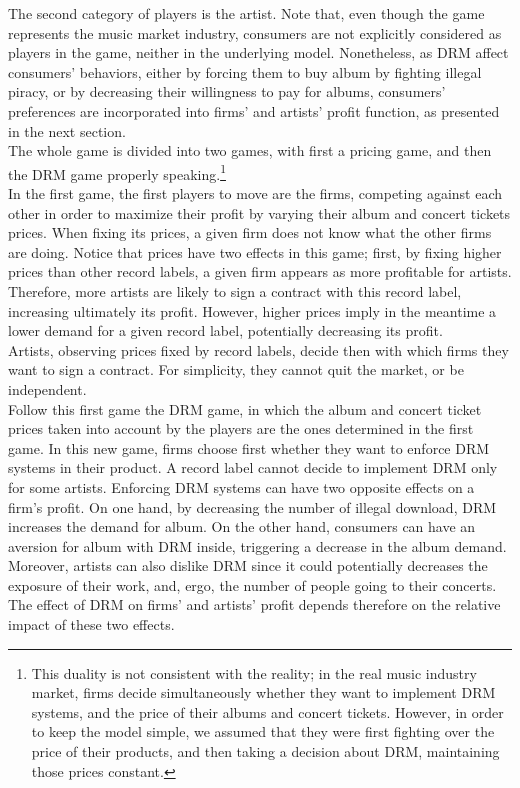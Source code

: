 \documentclass[a4paper,12pt]{article}
\numberwithin{equation}{section}
\begin{document}
The second category of players is the artist. Note that, even though the game represents the music market industry, consumers are not explicitly considered as players in the game, neither in the underlying model. Nonetheless, as DRM affect consumers' behaviors, either by forcing them to buy album by fighting illegal piracy, or by decreasing their willingness to pay for albums, consumers' preferences are incorporated into firms' and artists' profit function, as presented in the next section.\\

The whole game is divided into two games, with first a pricing game, and then the DRM game properly speaking.\footnote{
This duality is not consistent with the reality; in the real music industry market, firms decide simultaneously whether they want to implement DRM systems, and the price of their albums and concert tickets. However, in order to keep the model simple, we assumed that they were first fighting over the price of their products, and then taking a decision about DRM, maintaining those prices constant.
}\\

In the first game, the first players to move are the firms, competing against each other in order to maximize their profit by varying their album and concert tickets prices. When fixing its prices, a given firm does not know what the other firms are doing. Notice that prices have two effects in this game; first, by fixing higher prices than other record labels, a given firm appears as more profitable for artists. Therefore, more artists are likely to sign a contract with this record label, increasing ultimately its profit. However, higher prices imply in the meantime a lower demand for a given record label, potentially decreasing its profit.\\

Artists, observing prices fixed by record labels, decide then with which firms they want to sign a contract. For simplicity, they cannot quit the market, or be independent.\\

Follow this first game the DRM game, in which the album and concert ticket prices taken into account by the players are the ones determined in the first game. In this new game, firms choose first whether they want to enforce DRM systems in their product. A record label cannot decide to implement DRM only for some artists.  Enforcing DRM systems can have two opposite effects on a firm's profit. On one hand, by decreasing the number of illegal download, DRM increases the demand for album. On the other hand, consumers can have an aversion for album with DRM inside, triggering a decrease in the album demand. Moreover, artists can also dislike DRM since it could potentially decreases the exposure of their work, and, ergo, the number of people going to their concerts. The effect of DRM on firms' and artists' profit depends therefore on the relative impact of these two effects.
\end{document}

